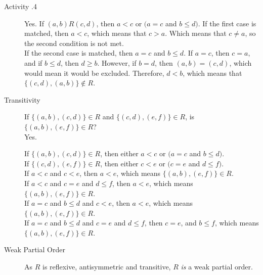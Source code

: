 \documentclass[\main/notes.tex]{subfiles}
\begin{document}
\begin{exercise}{Activity \thechapter.4}
\begin{questions}
\begin{questions}
\begin{answer}
\begin{description}
											Yes. If $(a, b) R (c, d)$, then $a < c$ or $(a = c$ and $b \leq d)$.
											If the first case is matched, then $a < c$, which means that $c > a$. Which means that $c \neq a$, so the second condition is not met.\\
											If the second case is matched, then $a = c$ and $b \leq d$. If $a = c$, then $c = a$, and if $b \leq d$, then $d \geq b$. However, if $b = d$, then $(a, b) = (c, d)$, which would mean it would be excluded. Therefore, $d < b$, which means that $\bigl\{(c, d), (a, b)\bigr\} \notin R$.
										\item[Transitivity] If $\bigl\{(a, b), (c, d)\bigr\} \in R$ and $\bigl\{(c, d), (e, f)\bigr\} \in R$, is $\bigl\{(a, b), (e, f)\bigr\} \in R$?\\
											Yes.
											\begin{indentparagraph}
												If $\bigl\{(a, b), (c, d)\bigr\} \in R$, then either $a < c$ or $(a = c$ and $b \leq d)$.\\
												If $\bigl\{(c, d), (e, f)\bigr\} \in R$, then either $c < e$ or $(c = e$ and $d \leq f)$.\\
												If $a < c$ and $c < e$, then $a < e$, which means $\bigl\{(a, b), (e, f)\bigr\} \in R$.\\
												If $a < c$ and $c = e$ and $d \leq f$, then $a < e$, which means $\bigl\{(a, b), (e, f)\bigr\} \in R$.\\
												If $a = c$ and $b \leq d$ and $c < e$, then $a < e$, which means $\bigl\{(a, b), (e, f)\bigr\} \in R$.\\
												If $a = c$ and $b \leq d$ and $c = e$ and $d \leq f$, then $c = e$, and $b \leq f$, which means $\bigl\{(a, b), (e, f)\bigr\} \in R$.
											\end{indentparagraph}
											\item[Weak Partial Order] As $R$ is reflexive, antisymmetric and transitive, $R$ \emph{is} a weak partial order.
									\end{description}
								\end{answer}
						\end{questions}
					\end{questions}
				\end{exercise}
			\pagebreak
\end{document}
